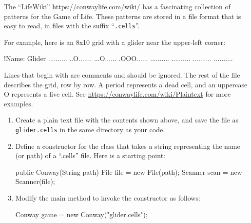 \begin{exercise}


The ``LifeWiki'' \url{https://conwaylife.com/wiki/} has a fascinating collection of patterns for the Game of Life.
These patterns are stored in a file format that is easy to read, in files with the suffix ``\verb|.cells|''.

For example, here is an 8x10 grid with a glider near the upper-left corner:

\begin{stdout}
!Name: Glider
..........
..O.......
...O......
.OOO......
..........
..........
..........
..........
\end{stdout}

Lines that begin with \java{!} are comments and should be ignored.
The rest of the file describes the grid, row by row.
A period represents a dead cell, and an uppercase O represents a live cell.
See \url{https://conwaylife.com/wiki/Plaintext} for more examples.

\begin{enumerate}

\item Create a plain text file with the contents shown above, and save the file as \verb|glider.cells| in the same directory as your code.


\item Define a constructor for the  class that takes a string representing the name (or path) of a ``.cells'' file.
Here is a starting point:

\begin{code}
public Conway(String path) {
    File file = new File(path);
    Scanner scan = new Scanner(file);
}
\end{code}

\item Modify the main method to invoke the constructor as follows:

\begin{code}
Conway game = new Conway("glider.cells");
\end{code}


\end{enumerate}
\end{exercise}
